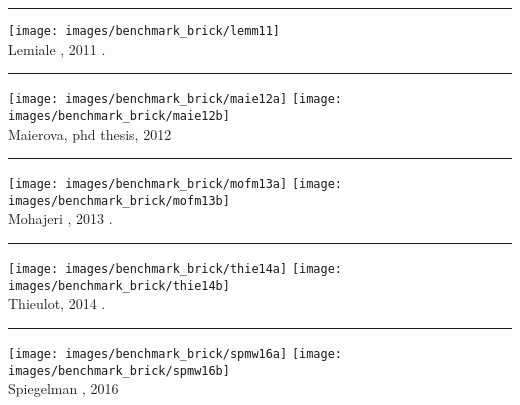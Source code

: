 \begin{center}\noindent\rule{12cm}{0.4pt}\end{center}

\begin{center}
\texttt{[image: images/benchmark\_brick/lemm11]}\\
{\captionfont Lemiale \etal, 2011 \cite{lemm11}.}
\end{center}

\begin{center}\noindent\rule{12cm}{0.4pt}\end{center}

\begin{center}
\texttt{[image: images/benchmark\_brick/maie12a]}
\texttt{[image: images/benchmark\_brick/maie12b]}\\
{\captionfont Maierova, phd thesis, 2012 \cite{maie12}}
\end{center}

\begin{center}\noindent\rule{12cm}{0.4pt}\end{center}

\begin{center}
\texttt{[image: images/benchmark\_brick/mofm13a]}
\texttt{[image: images/benchmark\_brick/mofm13b]}\\
{\captionfont Mohajeri \etal, 2013 \cite{mofm13}.}
\end{center}

\begin{center}\noindent\rule{12cm}{0.4pt}\end{center}

\begin{center}
\texttt{[image: images/benchmark\_brick/thie14a]}
\texttt{[image: images/benchmark\_brick/thie14b]}\\
{\captionfont Thieulot, 2014 \cite{thie14}.}
\end{center}

\begin{center}\noindent\rule{12cm}{0.4pt}\end{center}

\begin{center}
\texttt{[image: images/benchmark\_brick/spmw16a]}
\texttt{[image: images/benchmark\_brick/spmw16b]}\\
{\captionfont Spiegelman \etal, 2016 \cite{spmw16}}
\end{center}

